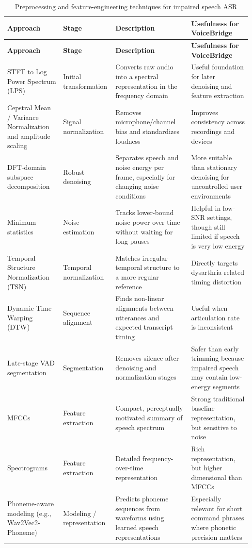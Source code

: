 \documentclass{article}
\begin{document}
\begin{longtable}{p{3.0cm} p{2.4cm} p{4.0cm} p{4.1cm}}
\caption{Preprocessing and feature-engineering techniques for impaired speech ASR} \\
\toprule
\textbf{Approach} & \textbf{Stage} & \textbf{Description} & \textbf{Usefulness for VoiceBridge} \\
\midrule
\endfirsthead
\toprule
\textbf{Approach} & \textbf{Stage} & \textbf{Description} & \textbf{Usefulness for VoiceBridge} \\
\midrule
\endhead
STFT to Log Power Spectrum (LPS) & Initial transformation & Converts raw audio into a spectral representation in the frequency domain & Useful foundation for later denoising and feature extraction \\
Cepstral Mean / Variance Normalization and amplitude scaling & Signal normalization & Removes microphone/channel bias and standardizes loudness & Improves consistency across recordings and devices \\
DFT-domain subspace decomposition & Robust denoising & Separates speech and noise energy per frame, especially for changing noise conditions & More suitable than stationary denoising for uncontrolled user environments \\
Minimum statistics & Noise estimation & Tracks lower-bound noise power over time without waiting for long pauses & Helpful in low-SNR settings, though still limited if speech is very low energy \\
Temporal Structure Normalization (TSN) & Temporal normalization & Matches irregular temporal structure to a more regular reference & Directly targets dysarthria-related timing distortion \\
Dynamic Time Warping (DTW) & Sequence alignment & Finds non-linear alignments between utterances and expected transcript timing & Useful when articulation rate is inconsistent \\
Late-stage VAD segmentation & Segmentation & Removes silence after denoising and normalization stages & Safer than early trimming because impaired speech may contain low-energy segments \\
MFCCs & Feature extraction & Compact, perceptually motivated summary of speech spectrum & Strong traditional baseline representation, but sensitive to noise \\
Spectrograms & Feature extraction & Detailed frequency-over-time representation & Rich representation, but higher dimensional than MFCCs \\
Phoneme-aware modeling (e.g., Wav2Vec2-Phoneme) & Modeling / representation & Predicts phoneme sequences from waveforms using learned speech representations & Especially relevant for short command phrases where phonetic precision matters \\
\bottomrule
\end{longtable}
\end{document}
